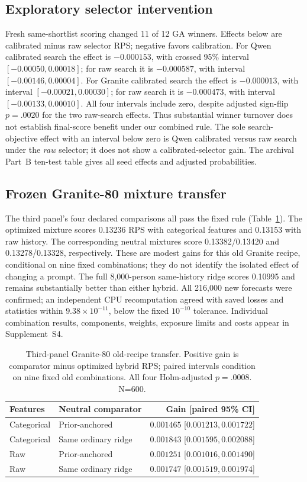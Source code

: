\documentclass[10pt,twocolumn]{article}
\newcommand{\ArchivalApp}{Supplement~S4}
\begin{document}
\subsection{Exploratory selector intervention}
Fresh same-shortlist scoring changed 11 of 12 GA winners. Effects below
are calibrated minus raw selector RPS; negative favors calibration.
For Qwen calibrated search the effect is $-0.000153$, with crossed 95\%
interval $[-0.00050,0.00018]$; for raw search it is $-0.000587$,
with interval $[-0.00146,0.00004]$.
For Granite calibrated search the effect is $-0.000013$, with interval
$[-0.00021,0.00030]$; for raw search it is $-0.000473$, with interval
$[-0.00133,0.00010]$.
All four intervals include zero,
despite adjusted sign-flip $p=.0020$ for the two raw-search effects. Thus
substantial winner turnover does not establish final-score benefit under our
combined rule. The sole search-objective effect with an interval below zero
is Qwen calibrated versus raw search under the \emph{raw} selector; it does
not show a calibrated-selector gain. The archival Part~B ten-test table gives
all seed effects and adjusted probabilities.

\subsection{Frozen Granite-80 mixture transfer}
The third panel's four declared comparisons all pass the fixed rule
(Table~\ref{tab:e3}). The optimized mixture scores 0.13236 RPS with categorical
features and 0.13153 with raw history. The corresponding neutral mixtures
score 0.13382/0.13420 and 0.13278/0.13328, respectively. These are modest
gains for this old Granite recipe, conditional on nine fixed combinations;
they do not identify the isolated effect of changing a prompt. The full
8,000-person same-history ridge scores 0.10995 and remains substantially
better than either hybrid. All 216,000 new forecasts were confirmed; an
independent CPU recomputation agreed with saved losses and statistics within
$9.38\times10^{-11}$, below the fixed $10^{-10}$ tolerance. Individual
combination results, components, weights, exposure limits and costs appear in
\ArchivalApp.

\begin{table}[t]\centering\scriptsize
\caption{Third-panel Granite-80 old-recipe transfer. Positive gain is
comparator minus optimized hybrid RPS; paired intervals condition on nine
fixed old combinations. All four Holm-adjusted $p=.0008$. N=600.}
\label{tab:e3}
\begin{tabular}{@{}llr@{}}\toprule
Features & Neutral comparator & Gain [paired 95\% CI]\\\midrule
Categorical & Prior-anchored & $0.001465$ [$0.001213,0.001722$]\\
Categorical & Same ordinary ridge & $0.001843$ [$0.001595,0.002088$]\\
Raw & Prior-anchored & $0.001251$ [$0.001016,0.001490$]\\
Raw & Same ordinary ridge & $0.001747$ [$0.001519,0.001974$]\\\bottomrule
\end{tabular}\end{table}
\end{document}
